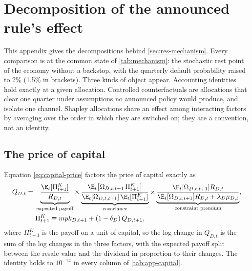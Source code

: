 \section{Decomposition of the announced rule's effect}
\label{app:mechanism}

This appendix gives the decompositions behind \cref{sec:res-mechanism}. Every comparison is at
the common state of \cref{tab:mechanism}: the stochastic rest point of the economy without a
backstop, with the quarterly default probability raised to 2\% (1.5\% in brackets). Three kinds
of object appear. Accounting identities hold exactly at a given allocation. Controlled
counterfactuals are allocations that clear one quarter under assumptions no announced policy
would produce, and isolate one channel. Shapley allocations share an effect among interacting
factors by averaging over the order in which they are switched on; they are a convention, not an
identity.

\subsection{The price of capital}
\label{app:mech-capital}

Equation \eqref{eq:capital-price} factors the price of capital exactly as
\begin{equation}
\begin{aligned}
Q_{D,t}={}&\underbrace{\frac{\E_t[\Pi^K_{t+1}]}{R_{D,t}}}_{\text{expected payoff}}
\times\underbrace{\frac{\E_t\bigl[\Omega_{D,t,t+1}\,\Pi^K_{t+1}\bigr]}
{\E_t[\Omega_{D,t,t+1}]\,\E_t[\Pi^K_{t+1}]}}_{\text{covariance}}
\times\underbrace{\frac{\E_t[\Omega_{D,t,t+1}]R_{D,t}}{\E_t[\Omega_{D,t,t+1}]R_{D,t}+\lambda_D\mu_{D,t}}}_{\text{constraint premium}},\\
&\Pi^K_{t+1}\equiv mpk_{D,t+1}+(1-\delta_D)\,Q_{D,t+1},
\end{aligned}
\label{eq:capital-price-factors}
\end{equation}
where $\Pi^K_{t+1}$ is the payoff on a unit of capital, so the log change in $Q_{D,t}$ is the sum of the log changes in the three factors, with the
expected payoff split between the resale value and the dividend in proportion to their changes.
The identity holds to $10^{-14}$ in every column of \cref{tab:app-capital}.

